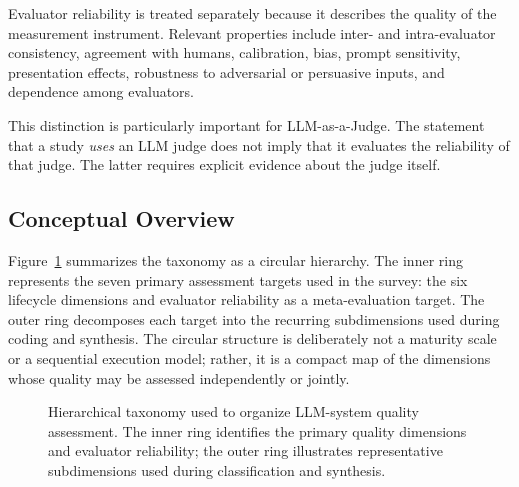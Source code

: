 Evaluator reliability is treated separately because it describes the quality of the measurement instrument. Relevant properties include inter- and intra-evaluator consistency, agreement with humans, calibration, bias, prompt sensitivity, presentation effects, robustness to adversarial or persuasive inputs, and dependence among evaluators.

This distinction is particularly important for LLM-as-a-Judge. The statement that a study \emph{uses} an LLM judge does not imply that it evaluates the reliability of that judge. The latter requires explicit evidence about the judge itself.

\subsection{Conceptual Overview}

Figure~\ref{fig:taxonomy} summarizes the taxonomy as a circular hierarchy. The inner ring represents the seven primary assessment targets used in the survey: the six lifecycle dimensions and evaluator reliability as a meta-evaluation target. The outer ring decomposes each target into the recurring subdimensions used during coding and synthesis. The circular structure is deliberately not a maturity scale or a sequential execution model; rather, it is a compact map of the dimensions whose quality may be assessed independently or jointly.

\begin{figure}[t]
    \centering
    \resizebox{0.92\textwidth}{!}{}
    \caption{Hierarchical taxonomy used to organize LLM-system quality assessment. The inner ring identifies the primary quality dimensions and evaluator reliability; the outer ring illustrates representative subdimensions used during classification and synthesis.}
    \label{fig:taxonomy}
\end{figure}

